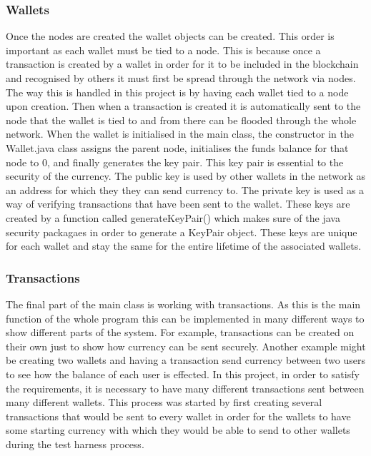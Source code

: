 \documentclass{l4proj}
\begin{document}
\subsubsection{Wallets}
Once the nodes are created the wallet objects can be created. This order is important as each wallet must be tied to
a node. This is because once a transaction is created by a wallet in order for it to be included in the blockchain
and recognised by others it must first be spread through the network via nodes. The way this is handled in this 
project is by having each wallet tied to a node upon creation. Then when a transaction is created it is automatically
sent to the node that the wallet is tied to and from there can be flooded through the whole network. When the wallet
is initialised in the main class, the constructor in the Wallet.java class assigns the parent node, initialises the
funds balance for that node to 0, and finally generates the key pair. This key pair is essential to the security 
of the currency. The public key is used by other wallets in the network as an address for which they they can send
currency to. The private key is used as a way of verifying transactions that have been sent to the wallet.
These keys are created by a function called generateKeyPair() which makes sure of the java security packagaes in order
to generate a KeyPair object. These keys are unique for each wallet and stay the same for the entire lifetime
of the associated wallets. 

\subsubsection{Transactions}
The final part of the main class is working with transactions. As this is the main function of the whole program
this can be implemented in many different ways to show different parts of the system. For example, transactions
can be created on their own just to show how currency can be sent securely. Another example might be creating two
wallets and having a transaction send currency between two users to see how the balance of each user is effected.
In this project, in order to satisfy the requirements, it is necessary to have many different transactions sent
between many different wallets. This process was started by first creating several transactions that would
be sent to every wallet in order for the wallets to have some starting currency with which they would be able to
send to other wallets during the test harness process. 
\end{document}
